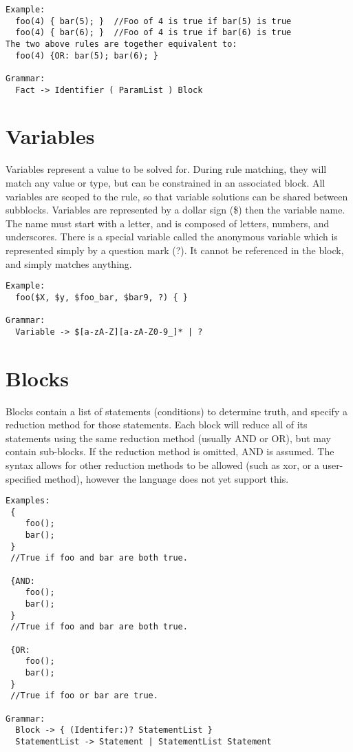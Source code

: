\documentclass[onecolumn,titlepage]{article}
\begin{document}
\begin{verbatim}
Example:
  foo(4) { bar(5); }  //Foo of 4 is true if bar(5) is true
  foo(4) { bar(6); }  //Foo of 4 is true if bar(6) is true
The two above rules are together equivalent to:
  foo(4) {OR: bar(5); bar(6); }

Grammar:
  Fact -> Identifier ( ParamList ) Block
\end{verbatim}

\section{Variables}
Variables represent a value to be solved for.  During rule matching, they will match any
value or type, but can be constrained in an associated block.  All variables are scoped to
the rule, so that variable solutions can be shared between subblocks.
Variables are represented by a dollar sign (\$) then the variable name. The name must
start with a letter, and is composed of letters, numbers, and underscores.  There is a special
variable called the anonymous variable which is represented simply by a question mark (?).  It
cannot be referenced in the block, and simply matches anything.
\begin{verbatim}
Example:
  foo($X, $y, $foo_bar, $bar9, ?) { }

Grammar:
  Variable -> $[a-zA-Z][a-zA-Z0-9_]* | ?
\end{verbatim}

\section{Blocks}
Blocks contain a list of statements (conditions) to determine truth, and specify a reduction 
method for those statements.  Each block will reduce all of its statements using the same
reduction method (usually AND or OR), but may contain sub-blocks.  If the reduction method
is omitted, AND is assumed.  The syntax allows for other reduction methods to be allowed
(such as xor, or a user-specified method), however the language does not yet support this.
\begin{verbatim}
Examples:
 { 
    foo();
    bar();
 }
 //True if foo and bar are both true.

 {AND:
    foo();
    bar();
 }
 //True if foo and bar are both true.

 {OR:
    foo();
    bar();
 }
 //True if foo or bar are true.

Grammar:
  Block -> { (Identifer:)? StatementList }
  StatementList -> Statement | StatementList Statement
\end{verbatim}
\end{document}
